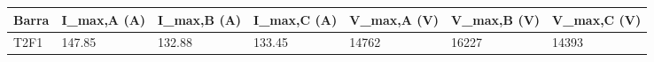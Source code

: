 \begin{tabular}{lllllll}
\toprule
Barra & I_{max,A} (A) & I_{max,B} (A) & I_{max,C} (A) & V_{max,A} (V) & V_{max,B} (V) & V_{max,C} (V) \\
\midrule
T2F1 & 147.85 & 132.88 & 133.45 & 14762 & 16227 & 14393 \\
\bottomrule
\end{tabular}
